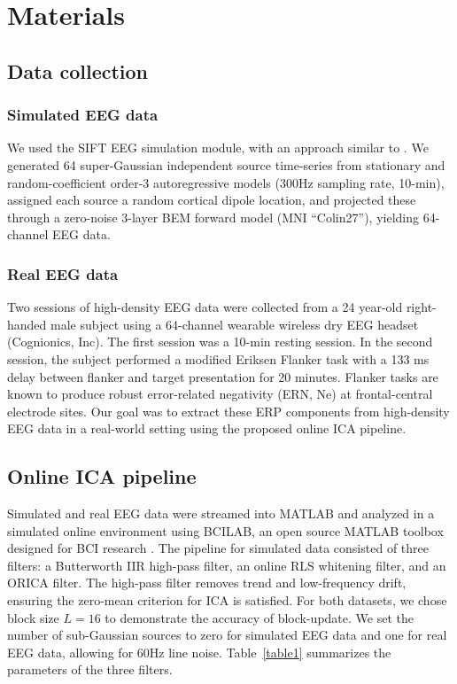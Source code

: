 \documentclass[letterpaper, 10 pt, conference]{ieeeconf}  %
\begin{document}
\section{Materials} \label{materials}
\subsection{Data collection}
\subsubsection{Simulated EEG data}
We used the SIFT EEG simulation module, with an approach similar to \cite{Haufe2010}. We generated 64 super-Gaussian independent source time-series from stationary and random-coefficient order-3 autoregressive models (300Hz sampling rate, 10-min), assigned each source a random cortical dipole location, and projected these through a zero-noise 3-layer BEM forward model (MNI ``Colin27''), yielding 64-channel EEG data.

\subsubsection{Real EEG data}
Two sessions of high-density EEG data were collected from a 24 year-old right-handed male subject using a 64-channel wearable wireless dry EEG headset (Cognionics, Inc). The first session was a 10-min resting session. In the second session, the subject performed a modified Eriksen Flanker task \cite{mcloughlin2009performance} with a 133 ms delay between flanker and target presentation for 20 minutes. Flanker tasks are known to produce robust error-related negativity (ERN, Ne) at frontal-central electrode sites. Our goal was to extract these ERP components from high-density EEG data in a real-world setting using the proposed online ICA pipeline.

\subsection{Online ICA pipeline}
Simulated and real EEG data were streamed into MATLAB and analyzed in a simulated online environment using BCILAB, an open source MATLAB toolbox designed for BCI research \cite{kothe2013bcilab}\cite{mullen2013real}. The pipeline for simulated data consisted of three filters: a Butterworth IIR high-pass filter, an online RLS whitening filter, and an ORICA filter. The high-pass filter removes trend and low-frequency drift, ensuring the zero-mean criterion for ICA is satisfied. For both datasets, we chose block size $L=16$ to demonstrate the accuracy of block-update. We set the number of sub-Gaussian sources to zero for simulated EEG data and one for real EEG data, allowing for 60Hz line noise. Table~\ref{table1} summarizes the parameters of the three filters.
\end{document}
